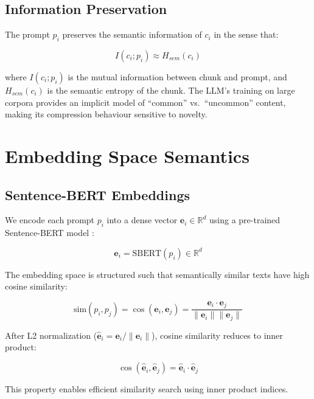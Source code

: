 \documentclass[11pt,a4paper]{article}
\begin{document}
\subsection{Information Preservation}

The prompt $p_i$ preserves the semantic information of $c_i$ in the sense that:

\begin{equation}
I(c_i; p_i) \approx H_{sem}(c_i)
\end{equation}

where $I(c_i; p_i)$ is the mutual information between chunk and prompt, and
$H_{sem}(c_i)$ is the semantic entropy of the chunk. The LLM's training on
large corpora provides an implicit model of ``common'' vs.\ ``uncommon''
content, making its compression behaviour sensitive to novelty.

\section{Embedding Space Semantics}

\subsection{Sentence-BERT Embeddings}

We encode each prompt $p_i$ into a dense vector $\mathbf{e}_i \in
\mathbb{R}^d$ using a pre-trained Sentence-BERT model
\citep{reimers2019sentence}:

\begin{equation}
\mathbf{e}_i = \text{SBERT}(p_i) \in \mathbb{R}^d
\end{equation}

The embedding space is structured such that semantically similar texts have
high cosine similarity:

\begin{equation}
\text{sim}(p_i, p_j) = \cos(\mathbf{e}_i, \mathbf{e}_j) = \frac{\mathbf{e}_i \cdot \mathbf{e}_j}{\|\mathbf{e}_i\| \|\mathbf{e}_j\|}
\end{equation}

After L2 normalization ($\hat{\mathbf{e}}_i = \mathbf{e}_i / \|\mathbf{e}_i\|$),
cosine similarity reduces to inner product:

\begin{equation}
\cos(\hat{\mathbf{e}}_i, \hat{\mathbf{e}}_j) = \hat{\mathbf{e}}_i \cdot \hat{\mathbf{e}}_j
\end{equation}

This property enables efficient similarity search using inner product indices.
\end{document}
